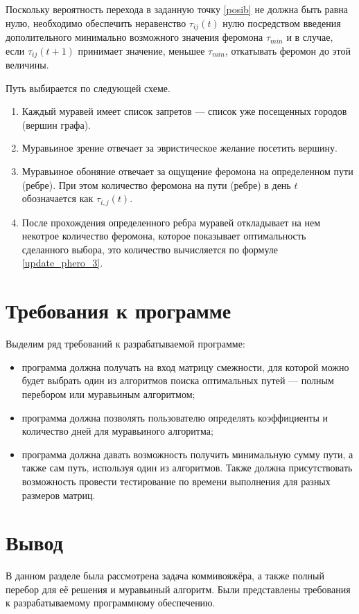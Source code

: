 Поскольку вероятность перехода в заданную точку \ref{posib} не должна быть равна нулю, необходимо обеспечить неравенство $\tau_{ij} (t)$ нулю посредством введения дополительного минимально возможного значения феромона $\tau_{min}$ и в случае, если $\tau_{ij} (t+1)$ принимает значение, меньшее $\tau_{min}$, откатывать феромон до этой величины. 


Путь выбирается по следующей схеме.
\begin{enumerate}
	\item Каждый муравей имеет список запретов --- список уже посещенных городов (вершин графа).
	\item Муравьиное зрение отвечает за эвристическое желание посетить вершину.
	\item Муравьиное обоняние отвечает за ощущение феромона на определенном пути (ребре). При этом количество феромона на пути (ребре) в день $t$ обозначается как $\tau_{i, j} (t)$.
	\item После прохождения определенного ребра муравей откладывает на нем некотрое количество феромона, которое показывает оптимальность сделанного выбора, это количество вычисляется по формуле \eqref{update_phero_3}.
\end{enumerate}

\section{Требования к программе}
Выделим ряд требований к разрабатываемой программе:
\begin{itemize}[label=---]
	\item программа должна получать на вход матрицу смежности, для которой можно будет выбрать один из алгоритмов поиска оптимальных путей --- полным перебором или муравьиным алгоритмом;
	\item программа должна позволять пользователю определять коэффициенты и количество дней для муравьиного алгоритма;
	\item программа должна давать возможность получить минимальную сумму пути, а также сам путь, используя один из алгоритмов. Также должна присутствовать возможность провести тестирование по времени выполнения для разных размеров матриц.
\end{itemize}

\section*{Вывод}

В данном разделе была рассмотрена задача коммивояжёра, а также полный перебор для её решения и муравьиный алгоритм. Были представлены требования к разрабатываемому программному обеспечению.
